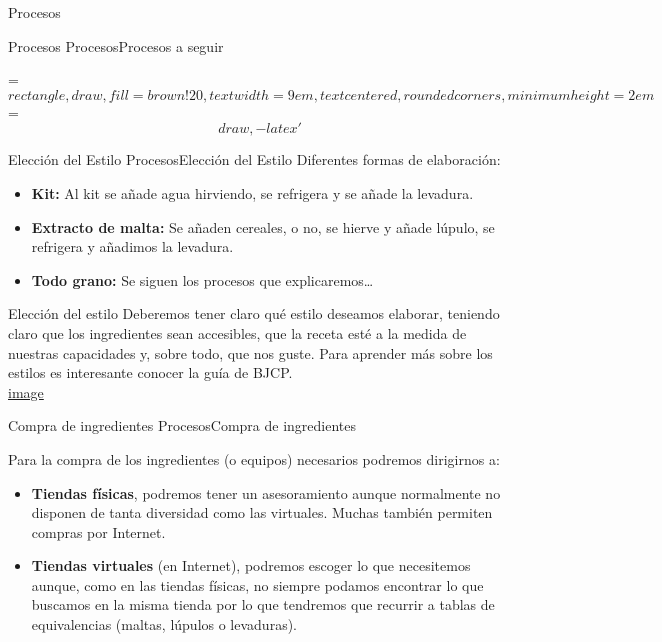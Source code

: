 \begin{frame}[fragile]{Procesos}
\protect\hypertarget{procesos}{}
\begin{block}{Procesos}
\protect\hypertarget{procesos-1}{}
ProcesosProcesos a seguir

= \[rectangle, draw, fill=brown!20, text width=9em, text centered,
rounded corners, minimum height=2em\] = \[draw, -latex'\]
\end{block}

\begin{block}{Elección del Estilo}
\protect\hypertarget{elecciuxf3n-del-estilo}{}
ProcesosElección del Estilo Diferentes formas de elaboración:

\begin{itemize}
\item
  \textbf{Kit:} Al kit se añade agua hirviendo, se refrigera y se añade
  la levadura.
\item
  \textbf{Extracto de malta:} Se añaden cereales, o no, se hierve y
  añade lúpulo, se refrigera y añadimos la levadura.
\item
  \textbf{Todo grano:} Se siguen los procesos que explicaremos\ldots{}
\end{itemize}

Elección del estilo Deberemos tener claro qué estilo deseamos elaborar,
teniendo claro que los ingredientes sean accesibles, que la receta esté
a la medida de nuestras capacidades y, sobre todo, que nos guste. Para
aprender más sobre los estilos es interesante conocer la guía de BJCP.\\
\href{https://www.thebeertimes.com/wp-content/uploads/2017/08/2015_Guidelines_Beer_Espa\%C3\%B1ol-final.pdf}{{image}}
\end{block}

\begin{block}{Compra de ingredientes}
\protect\hypertarget{compra-de-ingredientes}{}
ProcesosCompra de ingredientes

Para la compra de los ingredientes (o equipos) necesarios podremos
dirigirnos a:

\begin{itemize}
\item
  \textbf{Tiendas físicas}, podremos tener un asesoramiento aunque
  normalmente no disponen de tanta diversidad como las virtuales. Muchas
  también permiten compras por Internet.
\item
  \textbf{Tiendas virtuales} (en Internet), podremos escoger lo que
  necesitemos aunque, como en las tiendas físicas, no siempre podamos
  encontrar lo que buscamos en la misma tienda por lo que tendremos que
  recurrir a tablas de equivalencias (maltas, lúpulos o levaduras).


\end{itemize}
\end{block}
\end{frame}
